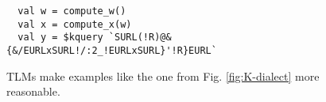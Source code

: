 \documentclass[acmsmall,10pt,review,anonymous]{acmart}\settopmatter{printfolios=true}
\newcommand{\li}[1]{\lstinline{#1}}
\begin{document}

\begin{figure}
\vspace{-4px}
\begin{lstlisting}
  val w = compute_w()
  val x = compute_x(w)
  val y = $kquery `SURL(!R)@&{&/EURLxSURL!/:2_!EURLxSURL}'!R}EURL`
\end{lstlisting}
\vspace{-10px}
\caption{TLMs make examples like the one from Fig. \ref{fig:K-dialect} more reasonable.}
\vspace{-12px}
\label{fig:K-tsm-example}
\end{figure}
\end{document}
